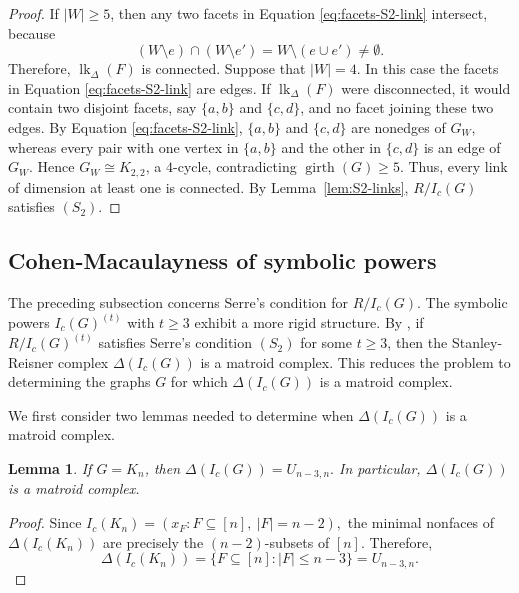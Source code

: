 \documentclass[12pt]{amsart}
\newtheorem{lemma}[proposition]{Lemma}
\DeclareMathOperator{\lk}{lk}
\begin{document}
\begin{proof}
If \(|W|\ge5\), then any two facets in Equation \eqref{eq:facets-S2-link} intersect, because
\[
(W\setminus e)\cap(W\setminus e')=W\setminus(e\cup e')\ne\emptyset.
\]
Therefore, $\lk_\Delta(F)$  is connected. Suppose that \(|W|=4\). In this case the facets in Equation \eqref{eq:facets-S2-link} are edges. If $\lk_\Delta(F)$ were disconnected, it would contain two disjoint facets, say \(\{a,b\}\) and \(\{c,d\}\), and no facet joining these two edges. By Equation \eqref{eq:facets-S2-link}, \(\{a,b\}\) and \(\{c,d\}\) are nonedges of \(G_W\), whereas every pair with one vertex in \(\{a,b\}\) and the other in \(\{c,d\}\) is an edge of \(G_W\). Hence \(G_W\cong K_{2,2}\), a \(4\)-cycle, contradicting \(\operatorname{girth}(G)\ge5\). Thus, every link of dimension at least one is connected. By Lemma~\ref{lem:S2-links}, \(R/I_c(G)\) satisfies \((S_2)\).
\end{proof}

\subsection{Cohen-Macaulayness of symbolic powers}\label{sec:symbolic-CM}

The preceding subsection concerns Serre's condition for \(R/I_c(G)\).
The symbolic powers $I_c(G)^{(t)}$ with $t \geq 3$ exhibit a more rigid structure. By \cite[Theorem~3.6]{Trung-Terai}, if
\(R/I_c(G)^{(t)}\) satisfies Serre's condition \((S_2)\) for some
\(t\geq3\), then the Stanley-Reisner complex
\(\Delta(I_c(G))\) is a matroid complex. This reduces the problem to
determining the graphs \(G\) for which \(\Delta(I_c(G))\) is a
matroid complex.


We first consider two lemmas needed to determine when
\(\Delta(I_c(G))\) is a matroid complex.

\begin{lemma}\label{lem:complete-matroid}
If \(G=K_n\), then $\Delta(I_c(G))=U_{n-3,n}.$ In particular, \(\Delta(I_c(G))\) is a matroid complex.
\end{lemma}

\begin{proof}
Since $I_c(K_n)=\left(x_F:F\subseteq[n],\ |F|=n-2\right),$
the minimal nonfaces of \(\Delta(I_c(K_n))\) are precisely the \((n-2)\)-subsets of \([n]\). Therefore,
\[
\Delta(I_c(K_n))=\{F\subseteq[n]:|F|\le n-3\}=U_{n-3,n}.
\]
\end{proof}
\end{document}
